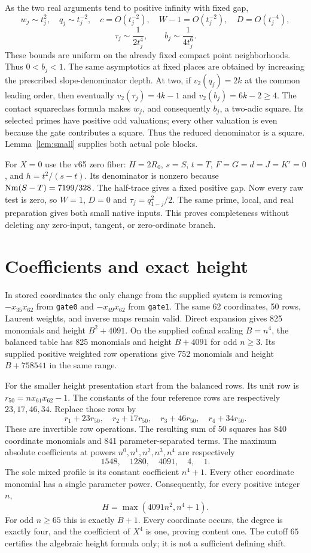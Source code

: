 \documentclass[11pt,a4paper]{article}
\begin{document}
As the two real arguments tend to positive infinity with fixed gap,
\[
 w_j\sim t_j^2,\quad q_j\sim t_j^{-2},\quad c=O(t_j^{-2}),\quad
 W-1=O(t_j^{-2}),\quad D=O(t_j^{-4}),
\]
\[
 \tau_j\sim\frac1{2t_j^4},\qquad b_j\sim\frac1{4t_j^6}.
\]
These bounds are uniform on the already fixed compact point
neighborhoods. Thus $0<b_j<1$. The same asymptotics at fixed places
are obtained by increasing the prescribed slope-denominator depth.
At two, if $v_2(q_j)=2k$ at the common leading order, then eventually
$v_2(\tau_j)=4k-1$ and $v_2(b_j)=6k-2\ge4$.
The contact squareclass formula makes $w_j$, and consequently $b_j$,
a two-adic square. Its selected primes have positive odd valuations;
every other valuation is even because the gate contributes a square.
Thus the reduced denominator is a square. Lemma~\ref{lem:small}
supplies both actual pole blocks.

For $X=0$ use the v65 zero fiber: $H=2R_0$, $s=S$, $t=T$,
$F=G=d=J=K'=0$, and $h=t^2/(s-t)$. Its denominator is nonzero
because $\operatorname{Nm}(S-T)=7199/328$. The half-trace gives a fixed positive gap.
Now every raw test is zero, so $W=1$, $D=0$ and
$\tau_j=q_{1-j}^2/2$. The same prime, local, and real preparation gives
both small native inputs. This proves completeness without deleting
any zero-input, tangent, or zero-ordinate branch.

\section{Coefficients and exact height}
In stored coordinates the only change from the supplied system is
removing $-x_{35}x_{62}$ from \texttt{gate0} and
$-x_{49}x_{62}$ from \texttt{gate1}. The same 62 coordinates, 50 rows,
Laurent weights, and inverse maps remain valid. Direct expansion gives
825 monomials and height $B^2+4091$. On the supplied cofinal scaling
$B=n^4$, the balanced table has 825 monomials and height $B+4091$
for odd $n\ge3$. Its supplied positive weighted row operations give
752 monomials and height $B+758541$ in the same range.

For the smaller height presentation start from the balanced rows.
Its unit row is $r_{50}=n x_{61}x_{62}-1$. The constants of the four
reference rows are respectively $23,17,46,34$. Replace those rows by
\[
 r_1+23r_{50},\quad r_2+17r_{50},\quad
 r_3+46r_{50},\quad r_4+34r_{50}.
\]
These are invertible row operations. The resulting sum of 50 squares
has 840 coordinate monomials and 841 parameter-separated terms.
The maximum absolute coefficients at powers $n^0,n^1,n^2,n^3,n^4$
are respectively
\[
                    1548,\quad1280,\quad4091,\quad4,\quad1.
\]
The sole mixed profile is its constant coefficient $n^4+1$.
Every other coordinate monomial has a single parameter power.
Consequently, for every positive integer $n$,
\[
                 H=\max(4091n^2,n^4+1).
\]
For odd $n\ge65$ this is exactly $B+1$.
Every coordinate occurs, the degree is exactly four, and the coefficient
of $X^4$ is one, proving content one. The cutoff $65$ certifies the
algebraic height formula only; it is not a sufficient defining shift.
\end{document}
